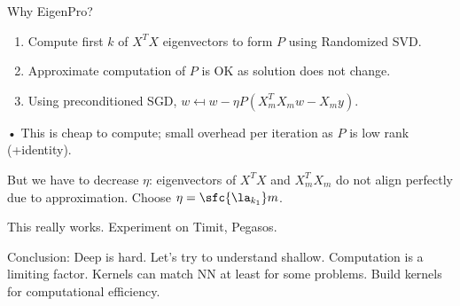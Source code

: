 Why EigenPro?
\begin{enumerate}
\item
Compute first $k$ of $X^TX$ eigenvectors to form $P$ using Randomized SVD.
\item
Approximate computation of $P$ is OK as solution does not change.
\item
Using preconditioned SGD, $w\mapsfrom w-\eta P(X^T_mX_m w - X_my)$. 
\end{enumerate}•
This is cheap to compute; small overhead per iteration as $P$ is low rank (+identity).

But we have to decrease $\eta$: eigenvectors of $X^TX$ and $X_m^TX_m$ do not align perfectly due to approximation. Choose $\eta=\sfc{\la_{k_1}}m$.

This really works. Experiment on Timit, Pegasos.

Conclusion: Deep is hard. Let's try to understand shallow. Computation is a limiting factor. Kernels can match NN at least for some problems. Build kernels for computational efficiency.

